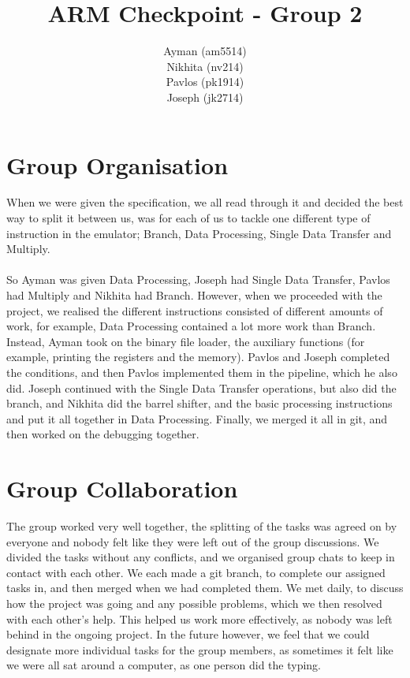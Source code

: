\documentclass[11pt]{article}
\begin{document}
\title{ARM Checkpoint - Group 2}
\author{Ayman (am5514) \\Nikhita (nv214)\\Pavlos (pk1914) \\Joseph (jk2714)}

\maketitle

\section{Group Organisation}
\noindent When we were given the specification, we all read through it and decided the best way to split it between us, was for each of us to tackle one different type of instruction in the emulator; Branch, Data Processing, Single Data Transfer and Multiply. 
\\
\\
So Ayman was given Data Processing, Joseph had Single Data Transfer, Pavlos had Multiply and Nikhita had Branch. However, when we proceeded with the project, we realised the different instructions consisted of different amounts of work, for example, Data Processing contained a lot more work than Branch. Instead, Ayman took on the binary file loader, the auxiliary functions (for example, printing the registers and the memory). Pavlos and Joseph completed the conditions, and then Pavlos implemented them in the pipeline, which he also did. Joseph continued with the Single Data Transfer operations, but also did the branch, and Nikhita did the barrel shifter, and the basic processing instructions and put it all together in Data Processing. Finally, we merged it all in git, and then worked on the debugging together. 

\section{Group Collaboration}

The group worked very well together, the splitting of the tasks was agreed on by everyone and nobody felt like they were left out of the group discussions. We divided the tasks without any conflicts, and we organised group chats to keep in contact with each other. We each made a git branch, to complete our assigned tasks in, and then merged when we had completed them. We met daily, to discuss how the project was going and any possible problems, which we then resolved with each other's help. This helped us work more effectively, as nobody was left behind in the ongoing project. In the future however, we feel that we could designate more individual tasks for the group members, as sometimes it felt like we were all sat around a computer, as one person did the typing.  
\newpage
\end{document}
